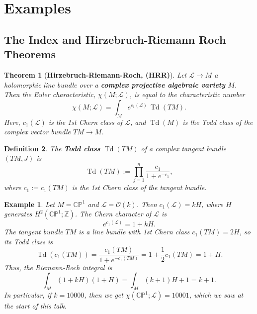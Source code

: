 \documentclass{article}
\newtheorem{theorem}{Theorem}[section]
\newtheorem{defn}[theorem]{Definition\rm}
\newtheorem{example}{Example}
\newcommand{\ra}{\rightarrow}
\newcommand{\PP}{\mathbb{P}}
\newcommand{\CC}{\mathbb{C}}
\newcommand{\ZZ}{\mathbb{Z}}
\newcommand{\mcL}{\mathcal{L}}
\newcommand{\mcO}{\mathcal{O}}
\DeclareMathOperator{\Td}{Td}
\begin{document}
\section{Examples}


\subsection{The Index and Hirzebruch-Riemann Roch Theorems}

\begin{theorem}[\textbf{Hirzebruch-Riemann-Roch, (HRR)}]
	Let $\mcL \ra M$ a holomorphic line bundle over a \textbf{complex projective algebraic variety} $M$. Then the Euler characteristic, $\chi(M; \mcL)$, is equal to the characteristic number
	\begin{equation*}
		\chi(M; \mcL) =	\int_{M} e^{c_{1}(\mcL)}\, \Td(TM).
	\end{equation*}
	Here, $c_{1}(\mcL)$ is the \emph{1st Chern class} of $\mcL$, and $\Td(M)$ is the \emph{Todd class} of the complex vector bundle $TM \ra M$.
\end{theorem}

\begin{defn}
	The \textbf{Todd class} $\Td(TM)$ of a complex tangent bundle $(TM, J)$ is
	\begin{equation*}
		\Td(TM) := \prod_{j = 1}^{n} \frac{c_{1}}{1 + e^{-c_{1}}},
	\end{equation*}
	where $c_{1} := c_{1}(TM)$ is the 1st Chern class of the tangent bundle.
\end{defn}

\begin{example}
	Let $M = \CC\PP^{1}$ and $\mcL = \mcO(k)$. Then $c_{1}(\mcL) = kH$, where $H$ generates $H^{2}(\CC\PP^{1}; \ZZ)$. The Chern character of $\mcL$ is
	\begin{equation*}
		e^{c_{1}(\mcL)} = 1 + kH.
	\end{equation*}
	The tangent bundle $TM$ is a line bundle with 1st Chern class $c_{1}(TM) = 2H$, so its Todd class is
	\begin{equation*}
		\Td(c_{1}(TM)) = \frac{c_{1}(TM)}{1 + e^{-c_{1}(TM)}} = 1 + \frac{1}{2}c_{1}(TM) = 1 + H.
	\end{equation*}
	Thus, the Riemann-Roch integral is
	\begin{equation*}
		\int_{M} (1 + kH)(1 + H) = \int_{M} (k+1)H + 1 = k+1.
	\end{equation*}
	In particular, if $k = 10000$, then we get $\chi(\CC\PP^{1}; \mcL) = 10001$, which we saw at the start of this talk.
\end{example}
\end{document}
